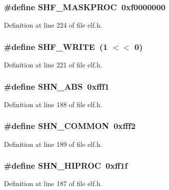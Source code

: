 \subsubsection[{SHF\_\-MASKPROC}]{\setlength{\rightskip}{0pt plus 5cm}\#define SHF\_\-MASKPROC~0xf0000000}\label{elf_8h_4a5fff5464bf6eb2a4d8a86481cff333}




Definition at line 224 of file elf.h.
\subsubsection[{SHF\_\-WRITE}]{\setlength{\rightskip}{0pt plus 5cm}\#define SHF\_\-WRITE~(1 $<$$<$ 0)}\label{elf_8h_025c79223b0fee4676337d660f76b59b}




Definition at line 221 of file elf.h.
\subsubsection[{SHN\_\-ABS}]{\setlength{\rightskip}{0pt plus 5cm}\#define SHN\_\-ABS~0xfff1}\label{elf_8h_322030426afae1a37a8ba1ab86a39066}




Definition at line 188 of file elf.h.
\subsubsection[{SHN\_\-COMMON}]{\setlength{\rightskip}{0pt plus 5cm}\#define SHN\_\-COMMON~0xfff2}\label{elf_8h_3d62721d3fe66370be9ec0ca0764ec7b}




Definition at line 189 of file elf.h.
\subsubsection[{SHN\_\-HIPROC}]{\setlength{\rightskip}{0pt plus 5cm}\#define SHN\_\-HIPROC~0xff1f}\label{elf_8h_5e94b5a4fc1e90cfc5d08af79025171b}




Definition at line 187 of file elf.h.
